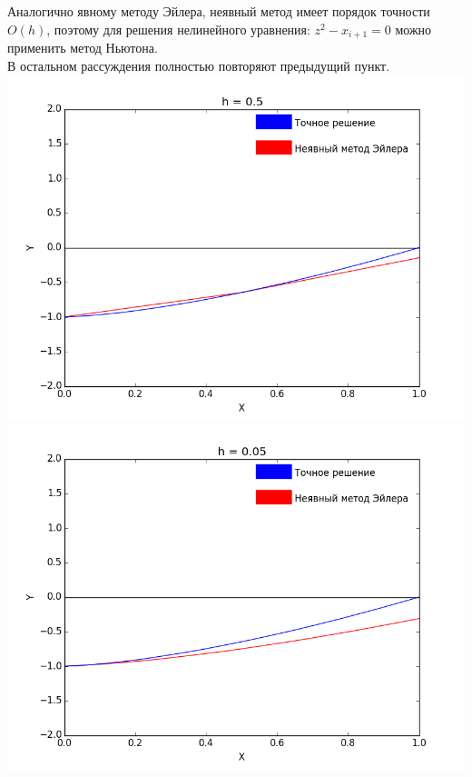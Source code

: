 \documentclass[12pt,a4paper]{article}
\begin{document}
        \noindent
        Аналогично явному методу Эйлера, неявный метод имеет порядок точности
        $O(h)$, поэтому для решения нелинейного уравнения: $z^{2} - x_{i+1} = 0$
        можно применить метод Ньютона.\\
        В остальном рассуждения полностью повторяют предыдущий пункт.\\
        \includegraphics[scale=0.45]{implicitEulerGraph_Step=0_5}
        \includegraphics[scale=0.45]{implicitEulerGraph_Step=0_05}
        
\end{document}
